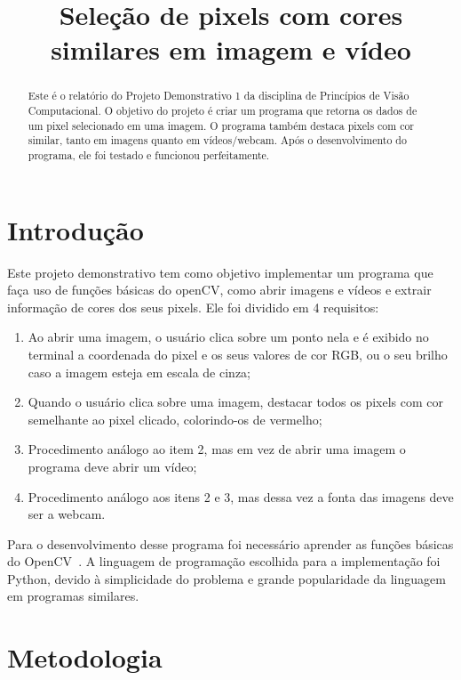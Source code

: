 \documentclass{bmvc2k}
\title{Seleção de pixels com cores \\similares em imagem e vídeo}
\begin{document}
\maketitle

\begin{abstract}
   Este é o relatório do Projeto Demonstrativo 1 da disciplina de Princípios de Visão Computacional. O objetivo do projeto é criar um programa que retorna os dados de um pixel selecionado em uma imagem. O programa também destaca pixels com cor similar, tanto em imagens quanto em vídeos/webcam. Após o desenvolvimento do programa, ele foi testado e funcionou perfeitamente.
\end{abstract}

\section{Introdução}
\label{sec:intro}

Este projeto demonstrativo tem como objetivo implementar um programa que faça uso de funções básicas do openCV, como abrir imagens e vídeos e extrair informação de cores dos seus pixels. Ele foi dividido em 4 requisitos:
\begin{enumerate}
    \item Ao abrir uma imagem, o usuário clica sobre um ponto nela e é exibido no terminal a coordenada do pixel e os seus valores de cor RGB, ou o seu brilho caso a imagem esteja em escala de cinza;
    \item Quando o usuário clica sobre uma imagem, destacar todos os pixels com cor semelhante ao pixel clicado, colorindo-os de vermelho;
    \item Procedimento análogo ao item 2, mas em vez de abrir uma imagem o programa deve abrir um vídeo;
    \item Procedimento análogo aos itens 2 e 3, mas dessa vez a fonta das imagens deve ser a webcam.
\end{enumerate}

Para o desenvolvimento desse programa foi necessário aprender as funções básicas do OpenCV~\cite{opencv}. A linguagem de programação escolhida para a implementação foi Python, devido à simplicidade do problema e grande popularidade da linguagem em programas similares.

\section{Metodologia}
\label{sec:met}
\end{document}
